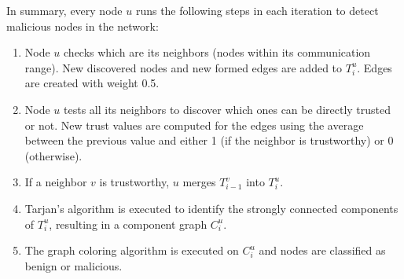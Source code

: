 \documentclass[conference]{IEEEtran}
\begin{document}
In summary, every node $u$ runs the following steps in each iteration to detect malicious nodes in the network:

\begin{enumerate}
	\item Node $u$ checks which are its neighbors (nodes within its communication range).
		  New discovered nodes and new formed edges are added to $T^u_i$.
		  Edges are created with weight 0.5.
	\item Node $u$ tests all its neighbors to discover which ones can be directly trusted or not.
		  New trust values are computed for the edges using the average between the previous value and either 1 (if the neighbor is trustworthy) or 0 (otherwise).
	\item If a neighbor $v$ is trustworthy, $u$ merges $T^v_{i-1}$ into $T^u_i$.
	\item Tarjan's algorithm is executed to identify the strongly connected components of $T^u_i$, resulting in a component graph $C^u_i$.
	\item The graph coloring algorithm is executed on $C^u_i$ and nodes are classified as benign or malicious. %
\end{enumerate}

%




\end{document}
